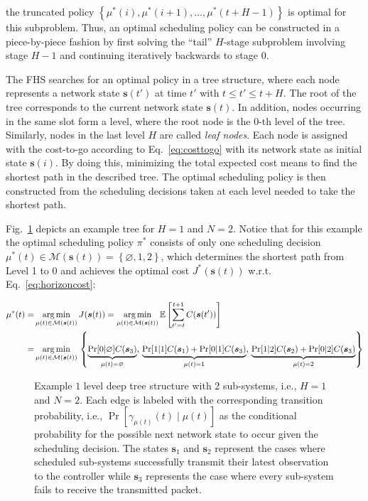 the truncated policy $\left\{ \mu^*(i), \mu^*(i+1), \dots, \mu^*(t+H-1)
\right\}$ is optimal for this subproblem. Thus, an optimal scheduling policy can
be constructed in a piece-by-piece fashion by first solving the ``tail''
$H$-stage subproblem involving stage $H-1$ and continuing iteratively backwards
to stage $0$. 

The FHS searches for an optimal policy in a tree structure, where each node
represents a network state $\boldsymbol{s}(t')$ at time $t'$ with $t \leq t'
\leq t+H$. The root of the tree corresponds to the current network state
$\boldsymbol{s}(t)$. In addition, nodes occurring in the same slot form a level,
where the root node is the 0-th level of the tree. Similarly, nodes in the last
level $H$ are called \textit{leaf nodes}. Each node is assigned with the
cost-to-go according to Eq.~\eqref{eq:costtogo} with its network state as
initial state $\boldsymbol{s}(i)$. By doing this, minimizing the total expected
cost means to find the shortest path in the described tree. The optimal
scheduling policy is then constructed from the scheduling decisions taken at
each level needed to take the shortest path.

Fig.~\ref{fig:FHStree} depicts an example tree for $H=1$ and $N=2$. Notice that
for this example the optimal scheduling policy $\pi^*$ consists of only one
scheduling decision $\mu^*(t) \in \mathcal{M}(\boldsymbol{s}(t)) =
\left\{\varnothing, 1, 2 \right\}$, which determines the shortest path from
Level 1 to 0 and achieves the optimal cost $J^*(\boldsymbol{s}(t))$ w.r.t.
Eq.~\eqref{eq:horizoncost}:

\begin{align*}
    \mu^*(t) =& \operatorname*{arg\,min}_{\mu(t)\in\mathcal{M}(\boldsymbol{s}(t))}{J(\boldsymbol{s}(t))}
    = \operatorname*{arg\,min}_{\mu(t)\in\mathcal{M}(\boldsymbol{s}(t))}{\mathbb{E} \left[ \sum_{t' = t }^{t + 1} C(\boldsymbol{s}(t')) \right]} \\
    =& \operatorname*{arg\,min}_{\mu(t)\in\mathcal{M}(\boldsymbol{s}(t))}{} \left\{
      \underbrace{\Pr[0|\varnothing] C(\boldsymbol{s}_3)}_{\mu(t)=\varnothing}, \,
      \underbrace{\Pr[1|1] C(\boldsymbol{s}_1) + \Pr[0|1] C(\boldsymbol{s}_3)}_{\mu(t)=1}, \,
      \underbrace{\Pr[1|2] C(\boldsymbol{s}_2) + \Pr[0|2] C(\boldsymbol{s}_3)}_{\mu(t)=2} \right\}
\end{align*}

\begin{figure}[htb]
	\centering
  \resizebox{.8\columnwidth}{!}{} 
  \caption[FHS: Example tree structure for $N=2$ and $H=1$]{Example $1$ level
  deep tree structure with $2$ sub-systems, i.e., $H=1$ and $N=2$. Each edge is
  labeled with the corresponding transition probability, i.e.,
  $\Pr{[\gamma_{\mu(t)}(t) \mid\mu(t)]}$ as the conditional probability for the
  possible next network state to occur given the scheduling decision. The states
  $\textbf{s}_1$ and $\textbf{s}_2$ represent the cases where scheduled
  sub-systems successfully transmit their latest observation to the controller
  while $\textbf{s}_3$ represents the case where every sub-system fails to
  receive the transmitted packet.}
	\label{fig:FHStree}
\end{figure}

